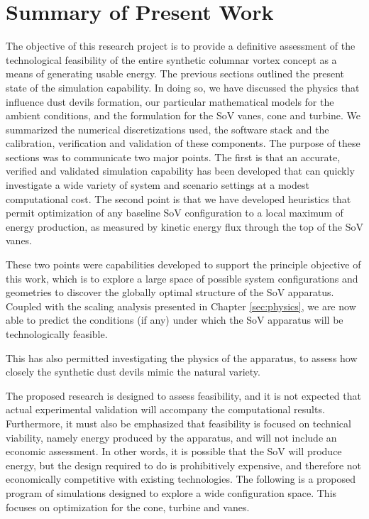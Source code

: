 \label{sec:conclusions}

%
%

%
%

\section{Summary of Present Work}

The objective of this research project is to provide a definitive
assessment of the technological feasibility of the entire synthetic
columnar vortex concept as a means of generating usable energy. The 
previous sections outlined the present state of the
simulation capability. In doing so, we have discussed the physics that
influence dust devils formation, our particular mathematical
models for the ambient conditions, and the formulation for the SoV
vanes, cone and turbine. We summarized the numerical discretizations
used, the software stack and the calibration, verification and
validation of these components. The purpose of these sections was to
communicate two major points. The first is that an accurate, verified
and validated simulation capability has been developed that can quickly
investigate a wide variety of system and scenario settings at a modest
computational cost. The second point is that we have developed
heuristics that permit optimization of any baseline SoV configuration to
a local maximum of energy production, as measured by kinetic energy flux 
through the top of the SoV vanes.  

These two points were capabilities developed to support the principle
objective of this work, which is to explore a large space of possible
system configurations and geometries to discover the globally optimal
structure of the SoV apparatus. Coupled with the scaling analysis
presented in Chapter \ref{sec:physics}, we are now able to predict
the conditions (if any) under which the SoV apparatus will be
technologically feasible. 

This has also permitted investigating the physics of the apparatus, to
assess how closely the synthetic dust devils mimic the natural
variety. 

%
%
The proposed research is designed to assess feasibility, and it is not
expected that actual experimental validation will accompany the
computational results. Furthermore, it must also be emphasized that
feasibility is focused on technical viability, namely energy produced by
the apparatus, and will not include an economic assessment. In other
words, it is possible that the SoV will produce energy, but the design
required to do is prohibitively expensive, and therefore not
economically competitive with existing technologies. The following is a
proposed program of simulations  designed to explore a wide
configuration space. This focuses on optimization for the cone, turbine and vanes. 



